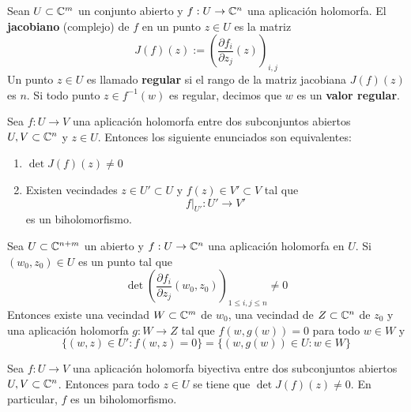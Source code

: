 \begin{definition}\label{puntoregular}
	Sean $U\subset \mathbb{C}^m$ un conjunto abierto y $f:U\to\mathbb{C}^n$ una aplicación holomorfa. El \textbf{jacobiano} (complejo) de $f$ en un punto $z\in U$ es la matriz 
	\begin{equation*}
		J(f)(z):=\left(\frac{\partial f_i}{\partial z_j}(z) \right)_{i,j}
	\end{equation*}
	Un punto $z\in U$ es llamado \textbf{regular} si el rango de la matriz jacobiana $J(f)(z)$ es $n$. Si todo punto $z\in f^{-1}(w)$ es regular, decimos que $w$ es un \textbf{valor regular}.
\end{definition}



\begin{theorem}
	Sea $f:U\to V$ una aplicación holomorfa entre dos subconjuntos abiertos $U,V\subset \mathbb{C}^n$ y $z\in U$. Entonces los siguiente enunciados son equivalentes:
	\begin{enumerate}
		\item $\det J(f)(z)\neq 0$
		\item Existen vecindades $z\in U'\subset U$ y $f(z)\in V'\subset V$ tal que 
		\begin{equation*}
			f\left.\right|_{U'}:U'\to V'
		\end{equation*}
		es un biholomorfismo.
	\end{enumerate}
\end{theorem}

\begin{theorem}\label{funcionimplicita}
	Sea $U\subset\mathbb{C}^{n+m}$ un abierto y $f:U\to \mathbb{C}^n$ una aplicación holomorfa en $U$. Si $(w_0,z_0)\in U$ es un punto tal que
	$$ \det\left(\frac{\partial f_i}{\partial z_j}(w_0,z_0)\right)_{1\leq i,j \leq n}\neq 0$$
	Entonces existe una vecindad $W\subset \mathbb{C}^m$ de $w_0$, una vecindad de $Z\subset\mathbb{C}^n$ de $z_0$ y una aplicación holomorfa $g:W\to Z$ tal que $f(w,g(w))=0$ para todo $w\in W$ y
	\begin{equation*}
		\{(w,z)\in U':f(w,z)=0\}=\{(w,g(w))\in U:w\in W\}
	\end{equation*}
\end{theorem}



\begin{propo}\label{biholomorfismojac}
	Sea $f:U\to V$ una aplicación holomorfa biyectiva entre dos subconjuntos abiertos $U,V\subset \mathbb{C}^n$. Entonces para todo $z\in U$ se tiene que $\det J(f)(z)\neq 0$. En particular, $f$ es un biholomorfismo.
\end{propo}

